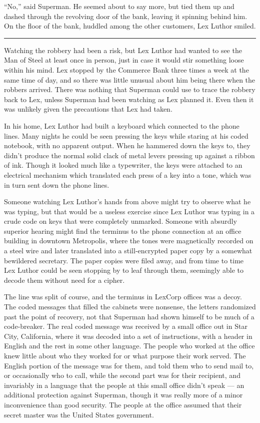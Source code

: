 ``No,'' said Superman. He seemed about to say more, but tied them up and
dashed through the revolving door of the bank, leaving it spinning
behind him. On the floor of the bank, huddled among the other customers,
Lex Luthor smiled.

\begin{center}\rule{0.5\linewidth}{0.5pt}\end{center}

Watching the robbery had been a risk, but Lex Luthor had wanted to see
the Man of Steel at least once in person, just in case it would stir
something loose within his mind. Lex stopped by the Commerce Bank three
times a week at the same time of day, and so there was little unusual
about him being there when the robbers arrived. There was nothing that
Superman could use to trace the robbery back to Lex, unless Superman had
been watching as Lex planned it. Even then it was unlikely given the
precautions that Lex had taken.

In his home, Lex Luthor had built a keyboard which connected to the
phone lines. Many nights he could be seen pressing the keys while
staring at his coded notebook, with no apparent output. When he hammered
down the keys to, they didn't produce the normal solid clack of metal
levers pressing up against a ribbon of ink. Though it looked much like a
typewriter, the keys were attached to an electrical mechanism which
translated each press of a key into a tone, which was in turn sent down
the phone lines.

Someone watching Lex Luthor's hands from above might try to observe what
he was typing, but that would be a useless exercise since Lex Luthor was
typing in a crude code on keys that were completely unmarked. Someone
with absurdly superior hearing might find the terminus to the phone
connection at an office building in downtown Metropolis, where the tones
were magnetically recorded on a steel wire and later translated into a
still‐encrypted paper copy by a somewhat bewildered secretary. The paper
copies were filed away, and from time to time Lex Luthor could be seen
stopping by to leaf through them, seemingly able to decode them without
need for a cipher.

The line was split of course, and the terminus in LexCorp offices was a
decoy. The coded messages that filled the cabinets were nonsense, the
letters randomized past the point of recovery, not that Superman had
shown himself to be much of a code‐breaker. The real coded message was
received by a small office out in Star City, California, where it was
decoded into a set of instructions, with a header in English and the
rest in some other language. The people who worked at the office knew
little about who they worked for or what purpose their work served. The
English portion of the message was for them, and told them who to send
mail to, or occasionally who to call, while the second part was for
their recipient, and invariably in a language that the people at this
small office didn't speak --- an additional protection against Superman,
though it was really more of a minor inconvenience than good security.
The people at the office assumed that their secret master was the United
States government.

